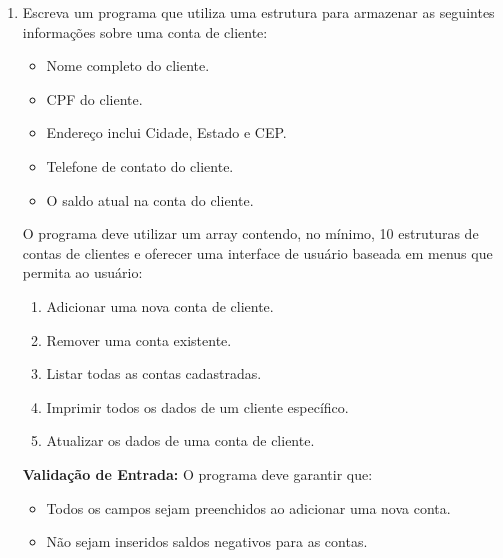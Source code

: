 \documentclass[12pt]{article}
\begin{document}
\begin{enumerate}
            \item Escreva um programa que utiliza uma estrutura para armazenar as seguintes informações sobre uma conta de cliente:
            \begin{itemize}
                \item Nome completo do cliente.
                \item CPF do cliente.
                \item Endereço inclui Cidade, Estado e CEP.
                \item Telefone de contato do cliente.
                \item O saldo atual na conta do cliente.
            \end{itemize}
            
            O programa deve utilizar um array contendo, no mínimo, 10 estruturas de contas de clientes e oferecer uma interface de usuário baseada em menus que permita ao usuário:
            \begin{enumerate}
                \item Adicionar uma nova conta de cliente.
                \item Remover uma conta existente.
                \item Listar todas as contas cadastradas.
                \item Imprimir todos os dados de um cliente específico.
                \item Atualizar os dados de uma conta de cliente.
            \end{enumerate}
            
            \textbf{Validação de Entrada:} O programa deve garantir que:
            \begin{itemize}
                \item Todos os campos sejam preenchidos ao adicionar uma nova conta.
                \item Não sejam inseridos saldos negativos para as contas.
            \end{itemize}
            
\end{enumerate}
\end{document}
